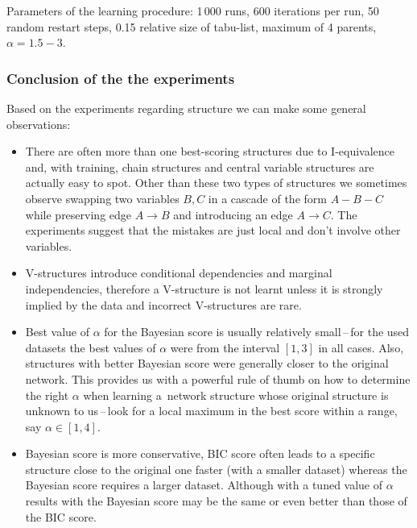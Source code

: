 \documentclass[english,cover]{fitthesis} %
\begin{document}

\medskip
Parameters of the learning procedure: 1\,000 runs, 600 iterations per run, 50 random restart steps, 0.15 relative size of tabu-list, maximum of 4 parents, $\alpha=1.5-3$.




\subsubsection{Conclusion of the the experiments}
Based on the experiments regarding structure we can make some general observations:
\begin{itemize}
    \item There are often more than one best-scoring structures due to I-equivalence and, with training, chain structures and central variable structures are actually easy to spot. Other than these two types of structures we sometimes observe swapping two variables $B,C$ in a cascade of the form $A-B-C$ while preserving edge $A \rightarrow B$ and introducing an edge $A \rightarrow C$. The experiments suggest that the mistakes are just local and don't involve other variables.
    \item V-structures introduce conditional dependencies and marginal independencies, therefore a V-structure is not learnt unless it is strongly implied by the data and incorrect V-structures are rare.
    \item Best value of $\alpha$ for the Bayesian score is usually relatively small\,--\,for the used datasets the best values of $\alpha$ were from the interval $[1,3]$ in all cases. Also, structures with better Bayesian score were generally closer to the original network. This provides us with a powerful rule of thumb on how to determine the right $\alpha$ when learning a~network structure whose original structure is unknown to us\,--\,look for a local maximum in the best score within a range, say $\alpha \in [1,4]$.
    \item Bayesian score is more conservative, BIC score often leads to a specific structure close to the original one faster (with a smaller dataset) whereas the Bayesian score requires a larger dataset. Although with a tuned value of $\alpha$ results with the Bayesian score may be the same or even better than those of the BIC score.
\end{itemize}
\end{document}

